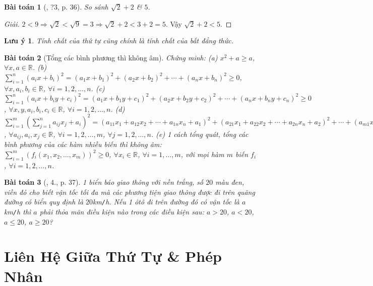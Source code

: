 \documentclass{article}
\newtheorem{baitoan}{Bài toán}
\newtheorem{luuy}{Lưu ý}
\begin{document}
\begin{baitoan}[\cite{SGK_Toan_8_tap_2}, ?3, p. 36]
	So sánh $\sqrt{2} + 2$ \& $5$.
\end{baitoan}

\begin{proof}[Giải]
	$2 < 9\Rightarrow\sqrt{2} < \sqrt{9} = 3\Rightarrow\sqrt{2} + 2 < 3 + 2 = 5$. Vậy $\sqrt{2} + 2 < 5$.
\end{proof}

\begin{luuy}
	Tính chất của thứ tự cũng chính là tính chất của bất đẳng thức.
\end{luuy}

\begin{baitoan}[Tổng các bình phương thì không âm]
	Chứng minh: (a) $x^2 + a\ge a$, $\forall x,a\in\mathbb{R}$. (b) $\sum_{i=1}^n (a_ix + b_i)^2 = (a_1x + b_1)^2 + (a_2x + b_2)^2 + \cdots + (a_nx + b_n)^2\ge0$, $\forall x,a_i,b_i\in\mathbb{R}$, $\forall i = 1,2,\ldots,n$. (c) $\sum_{i=1}^n (a_ix + b_iy + c_i)^2 = (a_1x + b_1y + c_1)^2 + (a_2x + b_2y + c_2)^2 + \cdots + (a_nx + b_ny + c_n)^2\ge0$, $\forall x,y,a_i,b_i,c_i\in\mathbb{R}$, $\forall i = 1,2,\ldots,n$. (d) $\sum_{i=1}^m\left(\sum_{j=1}^n a_{ij}x_j + a_i\right)^2 = (a_{11}x_1 + a_{12}x_2 + \cdots + a_{1n}x_n + a_1)^2 + (a_{21}x_1 + a_{22}x_2 + \cdots + a_{2n}x_n + a_2)^2 + \cdots + (a_{m1}x_1 + a_{m2}x_2 + \cdots + a_{mn}x_n + a_m)^2\ge0$, $\forall a_{ij},a_i,x_j\in\mathbb{R}$, $\forall i = 1,2,\ldots,m$, $\forall j = 1,2,\ldots,n$. (e) 1 cách tổng quát, tổng các bình phương của các hàm nhiều biến thì không âm: $\sum_{i=1}^m (f_i(x_1,x_2,\ldots,x_m))^2\ge0$, $\forall x_i\in\mathbb{R}$, $\forall i = 1,\ldots,m$, với mọi hàm $m$ biến $f_i$, $\forall i = 1,2,\ldots,n$.
\end{baitoan}

\begin{baitoan}[\cite{SGK_Toan_8_tap_2}, 4., p. 37]
	1 biển báo giao thông với nền trắng, số $20$ màu đen, viền đỏ cho biết vận tốc tối đa mà các phương tiện giao thông được đi trên quãng đường có biển quy định là $20$\emph{km\texttt{/}h}. Nếu 1 ôtô đi trên đường đó có vận tốc là $a$\emph{km\texttt{/}h} thì $a$ phải thỏa mãn điều kiện nào trong các điều kiện sau: $a > 20$, $a < 20$, $a\le20$, $a\ge20$?
\end{baitoan}


\section{Liên Hệ Giữa Thứ Tự \& Phép Nhân}
\end{document}
